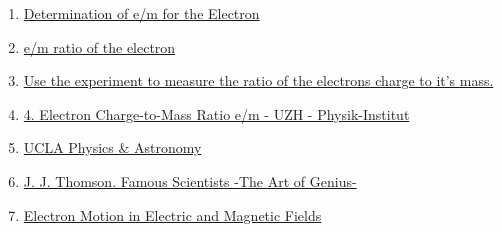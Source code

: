 \documentclass[../main.tex]{subfiles}
\begin{document}
\begin{enumerate}[1. ]
    \item \href{https://www.webassign.net/question_assets/unccolphyseml1/lab_4/manual.html}{Determination of e/m for the Electron}
    \item \href{https://physicsx.erau.edu/HelmholtzCoils/Lab_MP_1.pdf}{e/m ratio of the electron}
    \item \href{https://virtuelle-experimente.de/en/b-feld/e-m-bestimmung/edurchm.php}{Use the experiment to measure the ratio of the electrons charge to it's mass.}{}
    \item \href{https://www.physik.uzh.ch/~matthias/espace-assistant/manuals/en/anleitung_etom_e.pdf}{4. Electron Charge-to-Mass Ratio e/m - UZH - Physik-Institut}
    \item \href{https://demoweb.physics.ucla.edu/6b-lab-manual}{UCLA Physics \& Astronomy}
     \item \href{https://www.famousscientists.org/j-j-thomson/}{J. J. Thomson. Famous Scientists -The Art of Genius-}
     \item \href{https://virtuelle-experimente.de/en/index.php}{Electron Motion in Electric and Magnetic Fields}
\end{enumerate}
\end{document}
